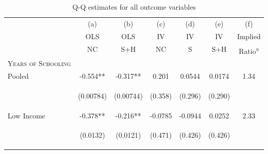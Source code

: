 \documentclass{article}[11pt,subeqn]
\begin{document}
\begin{spacing}{1.5}
\begin{table}[htpb!]														
\caption{Q-Q estimates for all outcome variables}														
\vspace{-3mm}														
\label{tab:fertilityALL}														
\begin{center}														
\begin{tabular}{lcccccc} \toprule														
& (a) & (b) & (c) & (d) & (e) & (f)\\														
& OLS & OLS & IV & IV & IV & Implied \\														
& NC & S+H & NC & S & S+H & Ratio\textsuperscript{a} \\														
\midrule														
\textsc{Years of Schooling} & & & & & &\\														
Pooled &		-0.554**	&	-0.317**	&	0.201	&	0.0544	&	0.0174	&	1.34		\\
\vspace{4pt} &	\begin{footnotesize}	(0.00784)	\end{footnotesize} & \begin{footnotesize}	(0.00744)	\end{footnotesize} & \begin{footnotesize}	(0.358)	\end{footnotesize} & \begin{footnotesize}	(0.296)	\end{footnotesize} & \begin{footnotesize}	(0.290)	\end{footnotesize} & \begin{footnotesize}		\end{footnotesize}	\\
Low Income &		-0.378**	&	-0.216**	&	-0.0785	&	-0.0944	&	0.0252	&	2.33		\\
\vspace{4pt} &	\begin{footnotesize}	(0.0132)	\end{footnotesize} & \begin{footnotesize}	(0.0121)	\end{footnotesize} & \begin{footnotesize}	(0.471)	\end{footnotesize} & \begin{footnotesize}	(0.426)	\end{footnotesize} & \begin{footnotesize}	(0.426)	\end{footnotesize} & \begin{footnotesize}		\end{footnotesize}	\\

\end{tabular}
\end{center}
\end{table}
\end{spacing}
\end{document}
